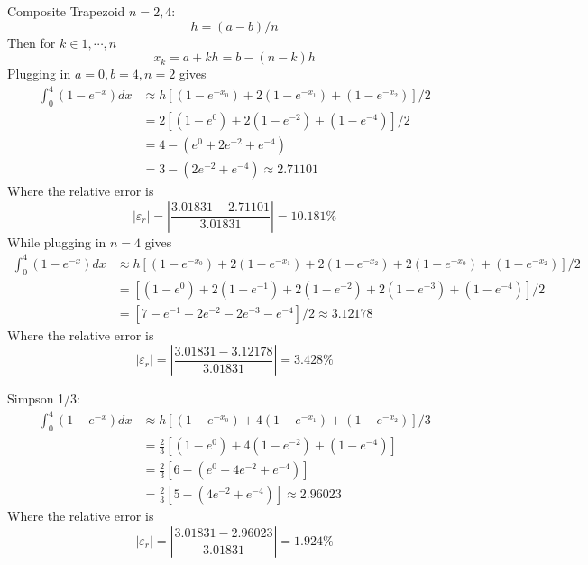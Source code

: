 \documentclass{article}
\begin{document}
\begin{solution}Composite Trapezoid $n=2,4$:\\
\[ h = (a-b)/n \]
Then for $k\in{1,\cdots,n}$
\[ x_{k} = a+kh = b-(n-k)h \]
Plugging in $a=0,b=4,n=2$ gives
\begin{align*}
\int_{0}^{4} (1-e^{-x})dx &\approx h\left[ (1-e^{-x_{0}}) + 2(1-e^{-x_{1}}) + (1-e^{-x_{2}})\right]/2\\
&= 2\left[ (1-e^{0}) + 2(1-e^{-2}) + (1-e^{-4})\right]/2\\
&= 4-(e^{0} +2e^{-2} +e^{-4})\\
&= 3-(2e^{-2} +e^{-4}) \approx \boxed{2.71101}
\end{align*}
Where the relative error is 
\[ \left|\varepsilon_{r}\right| = \left| \frac{3.01831 - 2.71101}{3.01831} \right| = \boxed{10.181\%} \]
While plugging in $n=4$ gives
\begin{align*}
\int_{0}^{4} (1-e^{-x})dx &\approx h\left[ (1-e^{-x_{0}}) + 2(1-e^{-x_{1}}) + 2(1-e^{-x_{2}}) + 2(1-e^{-x_{0}}) + (1-e^{-x_{2}})\right]/2\\
&= \left[ (1-e^{0}) + 2(1-e^{-1}) + 2(1-e^{-2}) + 2(1-e^{-3}) + (1-e^{-4})\right]/2\\
&= \left[ 7-e^{-1} -2e^{-2} -2e^{-3} -e^{-4} \right]/2 \approx \boxed{3.12178}
\end{align*}
Where the relative error is 
\[ \left|\varepsilon_{r}\right| = \left| \frac{3.01831 - 3.12178}{3.01831} \right| = \boxed{3.428\%} \]
\end{solution}

\begin{solution}Simpson 1/3:\\
\begin{align*}
\int_{0}^{4} (1-e^{-x})dx &\approx h\left[ (1-e^{-x_{0}}) + 4(1-e^{-x_{1}}) + (1-e^{-x_{2}})\right]/3\\
&= \frac{2}{3}\left[ (1-e^{0}) + 4(1-e^{-2}) + (1-e^{-4}) \right]\\
&= \frac{2}{3}\left[ 6-(e^{0} +4e^{-2} +e^{-4}) \right]\\
&= \frac{2}{3}\left[ 5-(4e^{-2} +e^{-4}) \right] \approx \boxed{2.96023}
\end{align*}
Where the relative error is 
\[ \left|\varepsilon_{r}\right| = \left| \frac{3.01831 - 2.96023}{3.01831} \right| = \boxed{1.924\%} \]
\end{solution}
\end{document}

